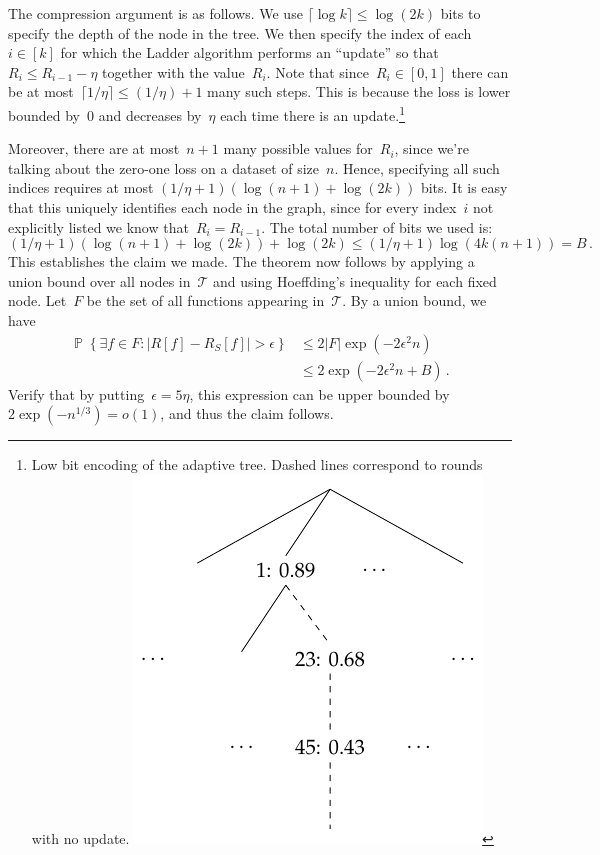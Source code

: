 \documentclass{tufte-book}
\begin{document}
\begin{Proof}
The compression argument is as follows. We use
\(\lceil\log k\rceil\le \log(2k)\) bits to specify the depth of the node
in the tree. We then specify the index of each~\(i\in[k]\) for which the
Ladder algorithm performs an ``update'' so that~\(R_i \le R_{i-1}-\eta\)
together with the value~\(R_i.\) Note that since~\(R_i \in[0,1]\) there
can be at most~\(\lceil 1/\eta\rceil\le (1/\eta)+1\) many such steps.
This is because the loss is lower bounded by~\(0\) and decreases
by~\(\eta\) each time there is an update.\footnote{Low bit encoding of
  the adaptive tree. Dashed lines correspond to rounds with no update.
  \includegraphics{assets/datasets-ladderpath}}

Moreover, there are at most~\(n+1\) many possible values for~\(R_i\),
since we're talking about the zero-one loss on a dataset of size~\(n\).
Hence, specifying all such indices requires at most
\((1/\eta + 1)(\log(n+1)+\log(2k))\) bits. It is easy that this uniquely
identifies each node in the graph, since for every index~\(i\) not
explicitly listed we know that~\(R_i=R_{i-1}.\) The total number of bits
we used is: \[
(1/\eta+1)(\log(n+1)+\log(2k))+\log(2k)
\le (1/\eta +1)\log(4k(n+1)) = B\,.
\] This establishes the claim we made. The theorem now follows by
applying a union bound over all nodes in~\(\mathcal{T}\) and using
Hoeffding's inequality for each fixed node. Let~\(F\) be the set of all
functions appearing in~\(\mathcal{T}.\) By a union bound, we have \[
\begin{aligned}
\mathop\mathbb{P}\left\{\exists f\in F\colon \left|R[f]-R_S[f]\right|>\epsilon\right\}
& \le 2|F|\exp(-2\epsilon^2n)\\
& \le 2\exp(-2\epsilon^2n+B)\,.
\end{aligned}
\] Verify that by putting~\(\epsilon=5\eta\), this expression can be
upper bounded by~\(2\exp(-n^{1/3})=o(1)\), and thus the claim follows.

\end{Proof}
\end{document}
